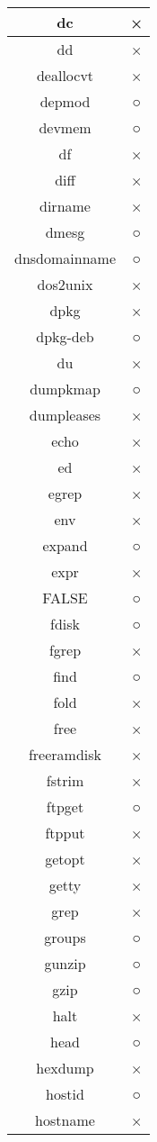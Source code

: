\begin{longtable}{cc}
dc & × \\ \hline
dd & × \\ \hline
deallocvt & × \\ \hline
depmod & ○ \\ \hline
devmem & ○ \\ \hline
df & × \\ \hline
diff & × \\ \hline
dirname & × \\ \hline
dmesg & ○ \\ \hline
dnsdomainname & ○ \\ \hline
dos2unix & × \\ \hline
dpkg & × \\ \hline
dpkg-deb & ○ \\ \hline
du & × \\ \hline
dumpkmap & ○ \\ \hline
dumpleases & × \\ \hline
echo & × \\ \hline
ed & × \\ \hline
egrep & × \\ \hline
env & × \\ \hline
expand & ○ \\ \hline
expr & × \\ \hline
FALSE & ○ \\ \hline
fdisk & ○ \\ \hline
fgrep & × \\ \hline
find & ○ \\ \hline
fold & × \\ \hline
free & × \\ \hline
freeramdisk & × \\ \hline
fstrim & × \\ \hline
ftpget & ○ \\ \hline
ftpput & × \\ \hline
getopt & × \\ \hline
getty & × \\ \hline
grep & × \\ \hline
groups & ○ \\ \hline
gunzip & ○ \\ \hline
gzip & ○ \\ \hline
halt & × \\ \hline
head & ○ \\ \hline
hexdump & × \\ \hline
hostid & ○ \\ \hline
hostname & × \\ \hline

\end{longtable}
